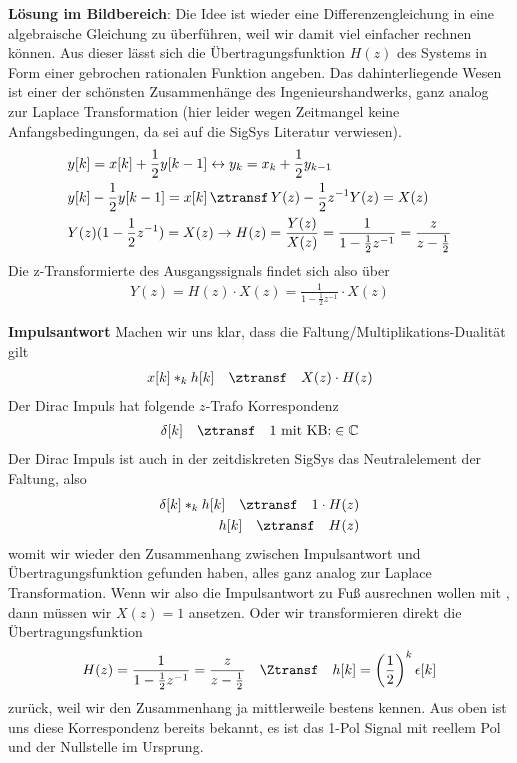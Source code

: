 \begin{ExCalc}
\textbf{Lösung im Bildbereich}:
Die Idee ist wieder eine Differenzengleichung in eine algebraische Gleichung zu überführen,
weil wir damit viel einfacher rechnen können.
Aus dieser lässt sich die Übertragungsfunktion $H(z)$ des Systems in Form einer
gebrochen rationalen Funktion angeben. Das dahinterliegende Wesen ist einer der
schönsten Zusammenhänge des Ingenieurshandwerks, ganz analog zur Laplace
Transformation (hier leider wegen Zeitmangel keine Anfangsbedingungen,
da sei auf die SigSys Literatur verwiesen).
\begin{align}
&y[k] = x[k] + \frac{1}{2} y[k-1] \leftrightarrow y_k = x_k + \frac{1}{2} y_{k-1}\\
&y[k] - \frac{1}{2} y[k-1] = x[k] \,\ztransf\, Y(z) - \frac{1}{2} z^{-1} Y(z) = X(z)\\
&Y(z) (1-\frac{1}{2} z^{-1}) = X(z) \rightarrow H(z) = \frac{Y(z)}{X(z)} =
\frac{1}{1-\frac{1}{2} z^{-1}} = \frac{z}{z-\frac{1}{2}}
\end{align}
Die z-Transformierte des Ausgangssignals findet sich also über
\begin{align}
\label{eq:Y_HX_zTrafo_A1D74A9E5B}
Y(z) = H(z) \cdot X(z) = \frac{1}{1-\frac{1}{2} z^{-1}} \cdot X(z)
\end{align}

\textbf{Impulsantwort}
Machen wir uns klar, dass die Faltung/Multiplikations-Dualität gilt
\begin{align}
x[k] \ast_k h[k] \quad\ztransf\quad X(z) \cdot H(z)
\end{align}
Der Dirac Impuls hat folgende $z$-Trafo Korrespondenz
\begin{align}
\delta[k] \quad\ztransf\quad 1\text{ mit KB:} \in\mathbb{C}
\end{align}
Der Dirac Impuls ist auch in der zeitdiskreten SigSys das Neutralelement der Faltung,
also
\begin{align}
\delta[k] \ast_k h[k] \quad\ztransf\quad 1 \cdot H(z)\\
h[k] \quad\ztransf\quad H(z)
\end{align}
womit wir wieder den Zusammenhang zwischen Impulsantwort und Übertragungsfunktion
gefunden haben, alles ganz analog zur Laplace Transformation.
%
Wenn wir also die Impulsantwort zu Fuß ausrechnen wollen
mit , dann müssen wir $X(z)=1$ ansetzen.
%
Oder wir transformieren direkt die Übertragungsfunktion
\begin{align}
H(z) = \frac{1}{1-\frac{1}{2} z^{-1}} = \frac{z}{z-\frac{1}{2}}
\quad\Ztransf\quad
h[k] = \left(\frac{1}{2}\right)^k \epsilon[k]
\end{align}
zurück, weil wir den Zusammenhang ja mittlerweile bestens kennen.
Aus  oben ist uns diese Korrespondenz
bereits bekannt, es ist das 1-Pol Signal mit reellem Pol und
der Nullstelle im Ursprung.


\end{ExCalc}
